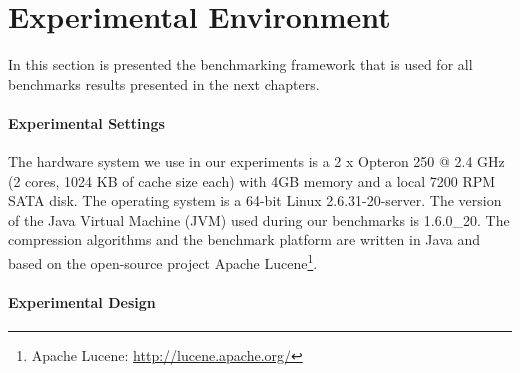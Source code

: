 \section{Experimental Environment}

In this section is presented the benchmarking framework that is used for all
benchmarks results presented in the next chapters.

\paragraph{Experimental Settings}

The hardware system we use in our experiments is a 2 x Opteron 250 @ 2.4 GHz
(2 cores, 1024 KB of cache size each) with 4GB memory and a local 7200 RPM
SATA disk. The operating system is a 64-bit Linux 2.6.31-20-server. The
version of the Java Virtual Machine (JVM) used during our benchmarks is
1.6.0\_20. The compression algorithms and the benchmark platform are written
in Java and based on the open-source project Apache Lucene\footnote{Apache
Lucene: \url{http://lucene.apache.org/}}.

\paragraph{Experimental Design}

